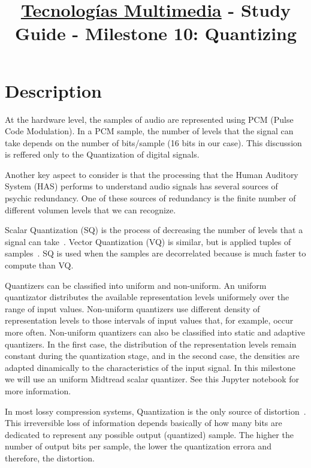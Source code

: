 \title{\href{https://www.ual.es/estudios/grados/presentacion/plandeestudios/asignatura/4015/40154321?idioma=zh_CN}{Tecnologías Multimedia} - Study Guide - Milestone 10: Quantizing}

\maketitle

\section{Description}

At the hardware level, the samples of audio are represented using PCM
(Pulse Code Modulation). In a PCM sample, the number of levels that
the signal can take depends on the number of bits/sample (16 bits in
our case). This discussion is reffered only to the Quantization of
digital signals.

Another key aspect to consider is that the processing that the Human
Auditory System (HAS) performs to understand audio signals has several
sources of psychic redundancy. One of these sources of redundancy is
the finite number of different volumen levels that we can recognize.

Scalar Quantization (SQ) is the process of decreasing the number of
levels that a signal can take~\cite{sayood}.  Vector Quantization (VQ)
is similar, but is applied tuples of
samples~\cite{foundationsofsignalprocessing}. SQ is used when the
samples are decorrelated because is much faster to compute than VQ.

Quantizers can be classified into uniform and non-uniform. An uniform
quantizator distributes the available representation levels uniformely
over the range of input values. Non-uniform quantizers use different
density of representation levels to those intervals of input values
that, for example, occur more often. Non-uniform quantizers can also
be classified into static and adaptive quantizers. In the first case,
the distribution of the representation levels remain constant during
the quantization stage, and in the second case, the densities are
adapted dinamically to the characteristics of the input signal. In
this milestone we will use an uniform Midtread scalar quantizer. See
this Jupyter notebook for more information.

In most lossy compression systems, Quantization is the only source of
distortion~\cite{taubman}. This irreversible loss of information
depends basically of how many bits are dedicated to represent any
possible output (quantized) sample. The higher the number of output
bits per sample, the lower the quantization errora and therefore, the
distortion.

